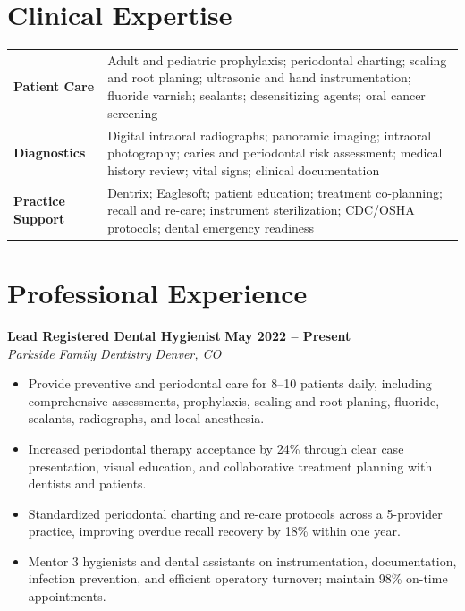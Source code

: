 \documentclass[10pt,letterpaper]{article}
\newcommand{\job}[4]{%
  \textbf{#1} \hfill \textbf{#2}\\[-1pt]
  \textit{\color{deepteal}#3} \hfill \textit{\color{muted}#4}\par
}
\begin{document}
\section*{Clinical Expertise}
\begin{tabularx}{\textwidth}{@{}>{\bfseries\color{deepteal}}p{}X@{}}
Patient Care & Adult and pediatric prophylaxis; periodontal charting; scaling and root planing; ultrasonic and hand instrumentation; fluoride varnish; sealants; desensitizing agents; oral cancer screening \\
Diagnostics & Digital intraoral radiographs; panoramic imaging; intraoral photography; caries and periodontal risk assessment; medical history review; vital signs; clinical documentation \\
Practice Support & Dentrix; Eaglesoft; patient education; treatment co-planning; recall and re-care; instrument sterilization; CDC/OSHA protocols; dental emergency readiness \\
\end{tabularx}

\section*{Professional Experience}

\job{Lead Registered Dental Hygienist}{May 2022 -- Present}{Parkside Family Dentistry}{Denver, CO}
\begin{itemize}
  \item Provide preventive and periodontal care for 8--10 patients daily, including comprehensive assessments, prophylaxis, scaling and root planing, fluoride, sealants, radiographs, and local anesthesia.
  \item Increased periodontal therapy acceptance by 24\% through clear case presentation, visual education, and collaborative treatment planning with dentists and patients.
  \item Standardized periodontal charting and re-care protocols across a 5-provider practice, improving overdue recall recovery by 18\% within one year.
  \item Mentor 3 hygienists and dental assistants on instrumentation, documentation, infection prevention, and efficient operatory turnover; maintain 98\% on-time appointments.
\end{itemize}
\end{document}
